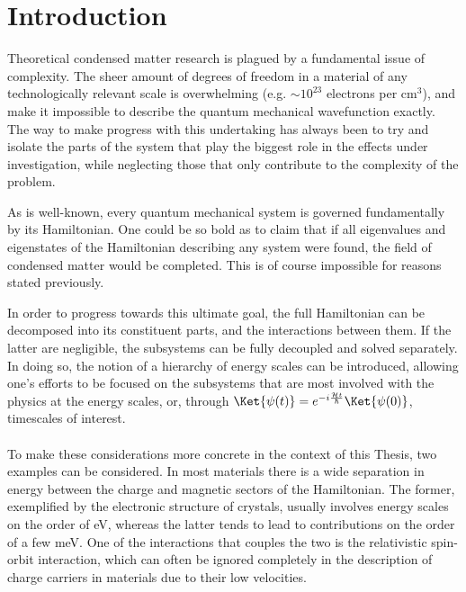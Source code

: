 \chapter{Introduction}
Theoretical condensed matter research is plagued by a fundamental issue of complexity. The sheer amount of degrees of freedom in a material of any technologically relevant scale is overwhelming (e.g. $\sim10^{23}$ electrons per cm$^3$), and make it impossible to describe the quantum mechanical wavefunction exactly.
The way to make progress with this undertaking has always been to try and isolate the parts of the system that play the biggest role in the effects under investigation, while neglecting those that only contribute to the complexity of the problem.

As is well-known, every quantum mechanical system is governed fundamentally by its Hamiltonian.
One could be so bold as to claim that if all eigenvalues and eigenstates of the Hamiltonian describing any system were found, the field of condensed matter would be completed. This is of course impossible for reasons stated previously.

In order to progress towards this ultimate goal, the full Hamiltonian can be decomposed into its constituent parts, and the interactions between them.
If the latter are negligible, the subsystems can be fully decoupled and solved separately. In doing so, the notion of a hierarchy of energy scales can be introduced, allowing one's efforts to be focused on the subsystems that are most involved with the physics at the energy scales, or, through $\Ket{\psi(t)} = e^{-i \frac{\mathcal{H}t}{\hbar}}\Ket{\psi(0)}$, timescales of interest.
\\\\
To make these considerations more concrete in the context of this Thesis, two examples can be considered.
In most materials there is a wide separation in energy between the charge and magnetic sectors of the Hamiltonian. The former, exemplified by the electronic structure of crystals, usually involves energy scales on the order of eV, whereas the latter tends to lead to contributions on the order of a few meV.
One of the interactions that couples the two is the relativistic spin-orbit interaction, which can often be ignored completely in the description of charge carriers in materials due to their low velocities.

